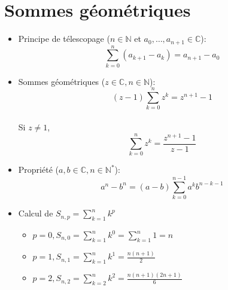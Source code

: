 \documentclass[fleqn]{article}
\begin{document}
\section{Sommes g\'eom\'etriques}
\begin{itemize}
	\item Principe de t\'elescopage (\(n \in \mathbb{N}\) et \(a_0, \hdots, a_{n+1} \in \mathbb{C}\)): \\
		\[\sum_{k=0}^{n} (a_{k+1} - a_k) = a_{n+1} - a_0\]
	\item Sommes g\'eom\'etriques (\(z \in \mathbb{C}, n \in \mathbb{N}\)):
		\[(z-1)\sum_{k=0}^{n}z^k = z^{n+1} -1\] \\
		Si \(z \neq 1\), \\
		\[\sum_{k=0}^{n}z^k=\frac{z^{n+1}-1}{z-1}\]
	\item Propri\'{e}t\'{e} (\(a,b \in \mathbb{C}, n \in \mathbb{N}^*\)): \\
		\[a^n-b^n = (a-b)\sum_{k=0}^{n-1}a^kb^{n-k-1}\]
	\item Calcul de \(S_{n,p} = \sum_{k=1}^{n}k^p\) \\
		\begin{itemize}
			\item \(p = 0, S_{n,0} = \sum_{k=1}^{n}k^0 = \sum_{k=1}^{n}1 = n\)
			\item \(p = 1, S_{n,1} = \sum_{k=1}^{n}k^1 = \frac{n(n+1)}{2} \)
			\item \(p = 2, S_{n,2} = \sum_{k=2}^{n}k^2 = \frac{n(n+1)(2n+1)}{6} \)
		\end{itemize}
\end{itemize}
\end{document}
